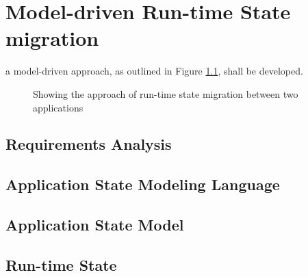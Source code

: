 \chapter{Model-driven Run-time State migration}
\label{ch:model_driven}
a model-driven approach, as outlined in Figure \ref{fig:solution}, shall be developed. 

\begin{figure}[!b]
    
    \caption{Showing the approach of run-time state migration between two applications }
    \label{fig:solution}
\end{figure}

\newpage

\section{Requirements Analysis}


\section{Application State Modeling Language}


\section{Application State Model}


\section{Run-time State}
